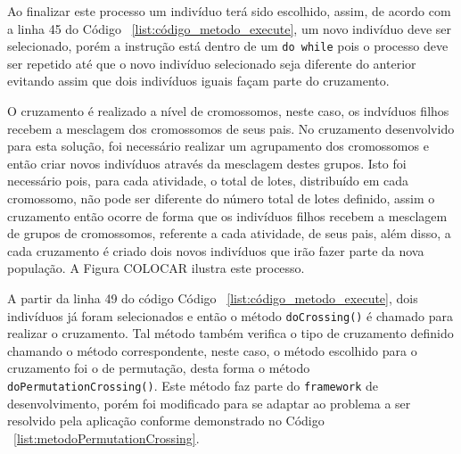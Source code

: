 \par Ao finalizar este processo um indivíduo terá sido escolhido, assim, de acordo com a linha 45 do Código ~\ref{list:código_metodo_execute},
um novo indivíduo deve ser selecionado, porém a instrução está dentro de um \texttt{do while} pois o processo deve ser repetido até que 
o novo indivíduo selecionado seja diferente do anterior evitando assim que dois indivíduos iguais façam parte do cruzamento.

\par O cruzamento é realizado a nível de cromossomos, neste caso, os indvíduos filhos recebem 
a mesclagem dos cromossomos de seus pais. No cruzamento desenvolvido para esta solução, foi 
necessário realizar um agrupamento dos cromossomos e então criar novos indivíduos através da
mesclagem destes grupos. Isto foi necessário pois, para cada atividade, o total de lotes,
distribuído em cada cromossomo, não pode ser diferente do número total de lotes definido, assim o 
cruzamento então ocorre de forma que os indivíduos filhos recebem a mesclagem de grupos de 
cromossomos, referente a cada atividade, de seus pais, além disso, a cada cruzamento é criado
dois novos indivíduos que irão fazer parte da nova população. A Figura COLOCAR ilustra este processo.



\par A partir da linha 49 do código Código ~\ref{list:código_metodo_execute}, dois indivíduos já foram selecionados e então o 
método \texttt{doCrossing()} é chamado para realizar o cruzamento. Tal método também verifica o tipo de cruzamento definido
chamando o método correspondente, neste caso, o método escolhido para o cruzamento foi o de permutação, desta forma o método
\texttt{doPermutationCrossing()}. Este método faz parte do \texttt{framework} de desenvolvimento, porém foi modificado para se 
adaptar ao problema a ser resolvido pela aplicação conforme demonstrado no Código ~\ref{list:metodoPermutationCrossing}.


